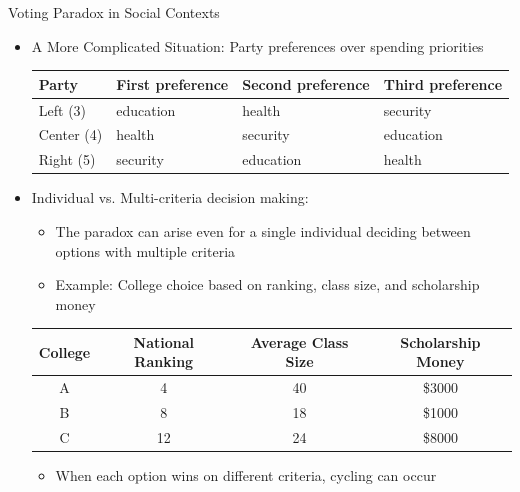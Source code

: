 \documentclass[10pt]{beamer}
\begin{document}
\begin{frame}{Voting Paradox in Social Contexts}
  \begin{itemize}
    \item A More Complicated Situation: Party preferences over spending priorities
      \begin{table}
        \center
        \begin{tabular}{llll}
          \toprule
          \textbf{Party} & \textbf{First preference} & \textbf{Second preference} & \textbf{Third preference} \\
          \midrule
          Left (3)   & education & health & security \\
          Center (4) & health & security & education \\
          Right (5)  & security & education & health \\
          \bottomrule
        \end{tabular}
      \end{table}
    \item Individual vs. Multi-criteria decision making:
      \begin{itemize}
        \item The paradox can arise even for a single individual deciding between options with multiple criteria
        \item Example: College choice based on ranking, class size, and scholarship money
      \end{itemize}
      \begin{table}
        \center
        \begin{tabular}{cccc}
          \toprule
          \textbf{College} & \textbf{National Ranking} & \textbf{Average Class Size} & \textbf{Scholarship Money} \\
          \midrule
          A & 4 & 40 & \$3000 \\
          B & 8 & 18 & \$1000 \\
          C & 12 & 24 & \$8000 \\
          \bottomrule
        \end{tabular}
      \end{table}
      \begin{itemize}
        \item When each option wins on different criteria, cycling can occur
      \end{itemize}
  \end{itemize}
\end{frame}
\end{document}
